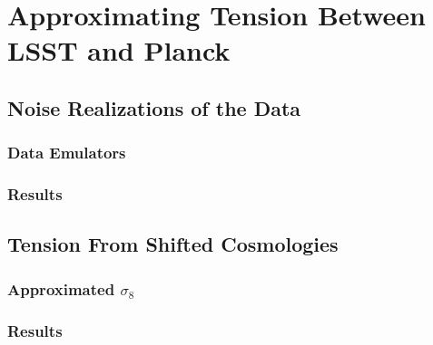 \chapter{Approximating Tension Between LSST and Planck}
\section{Noise Realizations of the Data}
\subsection{Data Emulators}
\subsection{Results}
\section{Tension From Shifted Cosmologies}
\subsection{Approximated $\sigma_8$}
\subsection{Results}